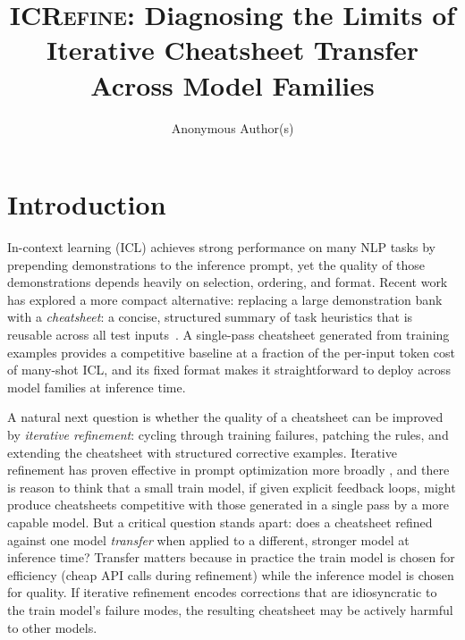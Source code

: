 \documentclass{article}
\title{\textsc{ICRefine}: Diagnosing the Limits of Iterative Cheatsheet Transfer Across Model Families}
\author{%
  Anonymous Author(s)
}
\begin{document}
\maketitle

\section{Introduction}
\label{sec:intro}

In-context learning (ICL) achieves strong performance on many NLP tasks by prepending
demonstrations to the inference prompt, yet the quality of those demonstrations depends
heavily on selection, ordering, and format.
Recent work has explored a more compact alternative: replacing a large demonstration bank
with a \emph{cheatsheet}: a concise, structured summary of task heuristics that is
reusable across all test inputs~\citep{csicl2024}.
A single-pass cheatsheet generated from training examples provides a competitive baseline
at a fraction of the per-input token cost of many-shot ICL, and its fixed format makes it
straightforward to deploy across model families at inference time.

A natural next question is whether the quality of a cheatsheet can be improved by
\emph{iterative refinement}: cycling through training failures, patching the rules, and
extending the cheatsheet with structured corrective examples.
Iterative refinement has proven effective in prompt optimization more broadly
\citep{opro2023,ape2022,zhou2022large}, and there is reason to think that a small train
model, if given explicit feedback loops, might produce cheatsheets competitive with those
generated in a single pass by a more capable model.
But a critical question stands apart: does a cheatsheet refined against one model
\emph{transfer} when applied to a different, stronger model at inference time?
Transfer matters because in practice the train model is chosen for efficiency
(cheap API calls during refinement) while the inference model is chosen for quality.
If iterative refinement encodes corrections that are idiosyncratic to the train model's
failure modes, the resulting cheatsheet may be actively harmful to other models.
\end{document}
